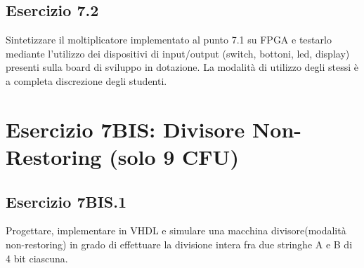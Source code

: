 
\implementazione
{}

\simulazione
{}

\timinganalysis
{}

\subsection{Esercizio 7.2}

\begin{traccia}
	Sintetizzare il moltiplicatore implementato al punto 7.1 su FPGA e testarlo mediante
	l'utilizzo dei dispositivi di input/output (switch, bottoni, led, display) presenti sulla
	board di sviluppo in dotazione. La modalità di utilizzo degli stessi è a completa
	discrezione degli studenti.
\end{traccia}

\sintesiboard
{}

\section{Esercizio 7BIS: Divisore Non-Restoring (solo 9 CFU)}

\subsection{Esercizio 7BIS.1}

\begin{traccia}
	Progettare, implementare in VHDL e simulare una macchina divisore\linebreak[0] (modalità non-restoring)
	in grado di effettuare la divisione intera fra due stringhe A e B di 4 bit ciascuna.
\end{traccia}

\progetto
{}

\implementazione
{}

\simulazione
{}

